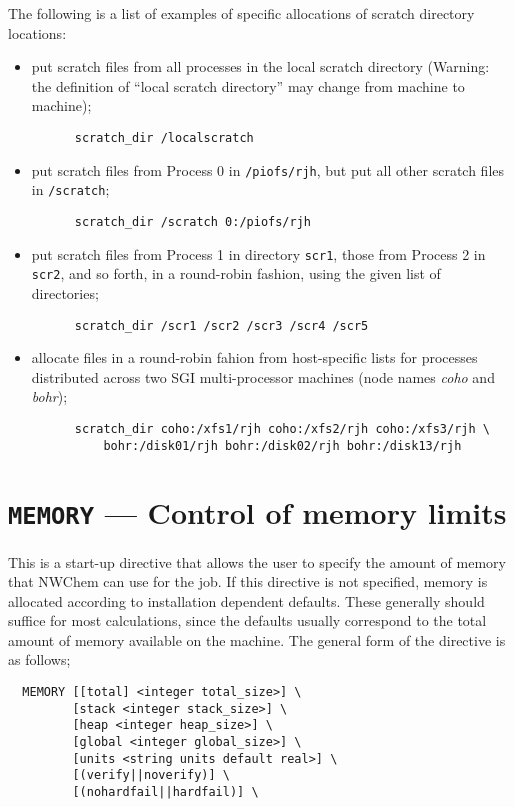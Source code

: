 The following is a list of examples of specific allocations of scratch
directory locations:
\begin{itemize}
\item put scratch files from all processes in the local scratch directory 
(Warning: the definition of ``local scratch directory'' may change from 
machine to machine);
\begin{verbatim}
      scratch_dir /localscratch
\end{verbatim}
\item put scratch files from Process 0 in \verb+/piofs/rjh+, but put all 
other scratch files in \verb+/scratch+;
\begin{verbatim}
      scratch_dir /scratch 0:/piofs/rjh
\end{verbatim}
\item put scratch files from Process 1 in directory \verb+scr1+, those from
Process 2 in \verb+scr2+, and so forth, in a round-robin fashion, using the
given list of directories;
\begin{verbatim}
      scratch_dir /scr1 /scr2 /scr3 /scr4 /scr5
\end{verbatim}
\item allocate files in a round-robin fahion from
  host-specific lists for processes distributed across two
 SGI multi-processor machines (node names {\it coho} and {\it bohr});
\begin{verbatim}
      scratch_dir coho:/xfs1/rjh coho:/xfs2/rjh coho:/xfs3/rjh \
          bohr:/disk01/rjh bohr:/disk02/rjh bohr:/disk13/rjh
\end{verbatim}
\end{itemize}

\section{{\tt MEMORY} --- Control of memory limits}

This is a start-up directive that allows the user to specify the
amount of memory that NWChem can use for the job.  If this directive
is not specified, memory is allocated according to installation
dependent defaults.  These generally should suffice for most
calculations, since the defaults usually correspond to the total amount
of memory available on the machine.  The general form of the directive
is as follows;

\begin{verbatim}
  MEMORY [[total] <integer total_size>] \
         [stack <integer stack_size>] \
         [heap <integer heap_size>] \
         [global <integer global_size>] \
         [units <string units default real>] \
         [(verify||noverify)] \
         [(nohardfail||hardfail)] \
\end{verbatim}

